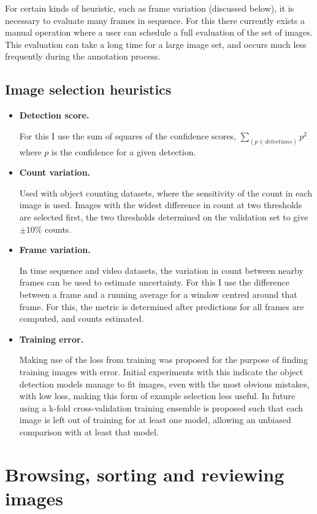 For certain kinds of heuristic, such as frame variation (discussed below), it is necessary to evaluate many frames in sequence. For this there currently exists a manual operation where a user can schedule a full evaluation of the set of images. This evaluation can take a long time for a large image set, and occurs much less frequently during the annotation process.


\subsection {Image selection heuristics}
\begin{itemize}
\item {\bf Detection score. }

For this I use the sum of squares of the confidence scores, $ \sum_(p \in detections){ p^2 } $ where $p$ is the confidence for a given detection. 

    \item {\bf Count variation. } \par
Used with object counting datasets, where the sensitivity of the count in each image is used. Images with the widest difference in count at two thresholds are selected first, the two thresholds determined on the validation set to give $ \pm 10\% $ counts.
    \item {\bf Frame variation. }  \par
In time sequence and video datasets, the variation in count between nearby frames can be used to estimate uncertainty. For this I use the difference between a frame and a running average for a window centred around that frame. For this, the metric is determined after predictions for all frames are computed, and counts estimated.
    \item {\bf Training error. }  \par
Making use of the loss from training was proposed for the purpose of finding training images with error. Initial experiments with this indicate the object detection models manage to fit images, even with the most obvious mistakes, with low loss, making this form of example selection less useful. In future using a k-fold cross-validation training ensemble is proposed such that each image is left out of training for at least one model, allowing an unbiased comparison with at least that model.
\end{itemize}


\section{Browsing, sorting and reviewing images}
\label{sec:browising}


